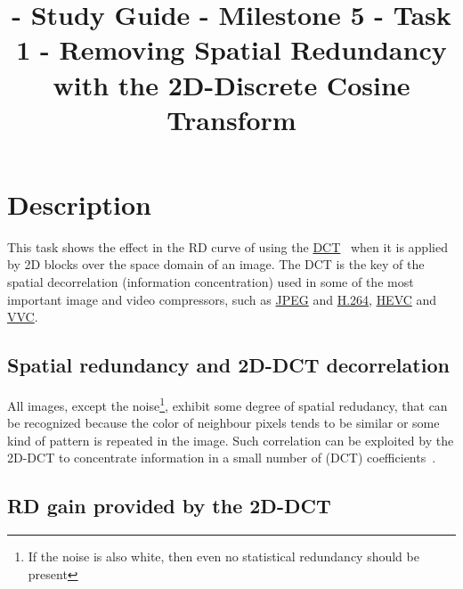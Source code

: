 

\title{\SM{} - Study Guide - Milestone 5 - Task 1 - Removing Spatial Redundancy with the 2D-Discrete Cosine Transform}

\maketitle

\tableofcontents

\section{Description}

This task shows the effect in the RD curve of using the
\href{https://en.wikipedia.org/wiki/Discrete_cosine_transform}{DCT}~\cite{vruiz__DCT}
when it is applied by 2D blocks over the space domain of an image. The
DCT is the key of the spatial decorrelation (information
concentration) used in some of the most important image and video
compressors, such as \href{https://en.wikipedia.org/wiki/JPEG}{JPEG}
and \href{https://en.wikipedia.org/wiki/Advanced_Video_Coding}{H.264},
\href{https://en.wikipedia.org/wiki/Advanced_Video_Coding}{HEVC} and
\href{https://en.wikipedia.org/wiki/Versatile_Video_Coding}{VVC}.

\subsection{Spatial redundancy and 2D-DCT decorrelation}

All images, except the noise\footnote{If the noise is also white, then
even no statistical redundancy should be present}, exhibit some degree
of spatial redudancy, that can be recognized because the color of
neighbour pixels tends to be similar or some kind of pattern is
repeated in the image. Such correlation can be exploited by the 2D-DCT to
concentrate information in a small number of (DCT)
coefficients~\cite{vruiz__DCT}.

\subsection{RD gain provided by the 2D-DCT}

